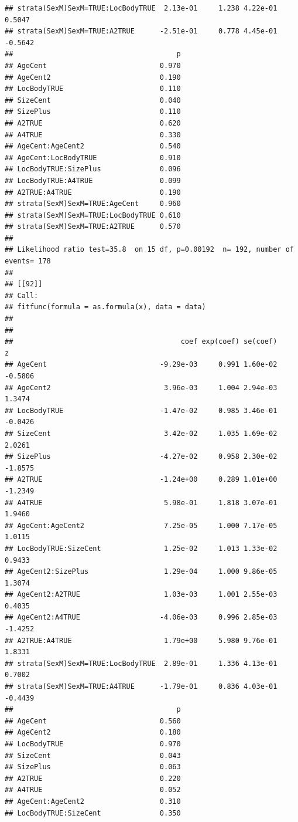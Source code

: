 \documentclass{article}\usepackage[]{graphicx}\usepackage[]{color}
\makeatletter
\newenvironment{kframe}{%
 \def\at@end@of@kframe{}%
 \ifinner\ifhmode%
  \def\at@end@of@kframe{\end{minipage}}%
  \begin{minipage}{\columnwidth}%
 \fi\fi%
 \def\FrameCommand##1{\hskip\@totalleftmargin \hskip-\fboxsep
 \colorbox{shadecolor}{##1}\hskip-\fboxsep
     \hskip-\linewidth \hskip-\@totalleftmargin \hskip\columnwidth}%
 \MakeFramed {\advance\hsize-\width
   \@totalleftmargin\z@ \linewidth\hsize
   \@setminipage}}%
 {\par\unskip\endMakeFramed%
 \at@end@of@kframe}
\newenvironment{knitrout}{}{} %
\makeatother
\begin{document}
\begin{knitrout}
\begin{kframe}
\begin{verbatim}
## strata(SexM)SexM=TRUE:LocBodyTRUE  2.13e-01     1.238 4.22e-01  0.5047
## strata(SexM)SexM=TRUE:A2TRUE      -2.51e-01     0.778 4.45e-01 -0.5642
##                                       p
## AgeCent                           0.970
## AgeCent2                          0.190
## LocBodyTRUE                       0.110
## SizeCent                          0.040
## SizePlus                          0.110
## A2TRUE                            0.620
## A4TRUE                            0.330
## AgeCent:AgeCent2                  0.540
## AgeCent:LocBodyTRUE               0.910
## LocBodyTRUE:SizePlus              0.096
## LocBodyTRUE:A4TRUE                0.099
## A2TRUE:A4TRUE                     0.190
## strata(SexM)SexM=TRUE:AgeCent     0.960
## strata(SexM)SexM=TRUE:LocBodyTRUE 0.610
## strata(SexM)SexM=TRUE:A2TRUE      0.570
## 
## Likelihood ratio test=35.8  on 15 df, p=0.00192  n= 192, number of events= 178 
## 
## [[92]]
## Call:
## fitfunc(formula = as.formula(x), data = data)
## 
## 
##                                        coef exp(coef) se(coef)       z
## AgeCent                           -9.29e-03     0.991 1.60e-02 -0.5806
## AgeCent2                           3.96e-03     1.004 2.94e-03  1.3474
## LocBodyTRUE                       -1.47e-02     0.985 3.46e-01 -0.0426
## SizeCent                           3.42e-02     1.035 1.69e-02  2.0261
## SizePlus                          -4.27e-02     0.958 2.30e-02 -1.8575
## A2TRUE                            -1.24e+00     0.289 1.01e+00 -1.2349
## A4TRUE                             5.98e-01     1.818 3.07e-01  1.9460
## AgeCent:AgeCent2                   7.25e-05     1.000 7.17e-05  1.0115
## LocBodyTRUE:SizeCent               1.25e-02     1.013 1.33e-02  0.9433
## AgeCent2:SizePlus                  1.29e-04     1.000 9.86e-05  1.3074
## AgeCent2:A2TRUE                    1.03e-03     1.001 2.55e-03  0.4035
## AgeCent2:A4TRUE                   -4.06e-03     0.996 2.85e-03 -1.4252
## A2TRUE:A4TRUE                      1.79e+00     5.980 9.76e-01  1.8331
## strata(SexM)SexM=TRUE:LocBodyTRUE  2.89e-01     1.336 4.13e-01  0.7002
## strata(SexM)SexM=TRUE:A4TRUE      -1.79e-01     0.836 4.03e-01 -0.4439
##                                       p
## AgeCent                           0.560
## AgeCent2                          0.180
## LocBodyTRUE                       0.970
## SizeCent                          0.043
## SizePlus                          0.063
## A2TRUE                            0.220
## A4TRUE                            0.052
## AgeCent:AgeCent2                  0.310
## LocBodyTRUE:SizeCent              0.350

\end{verbatim}
\end{kframe}
\end{knitrout}
\end{document}
